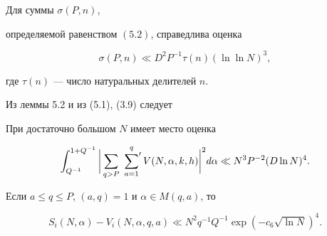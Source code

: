 \begin{lems}


Для суммы $\sigma (P, n)$, 


определяемой равенством $(5.2)$, справедлива оценка


$$


\sigma (P, n)\ll D^2 P^{-1}\tau(n)(\ln\ln N)^3, 


$$


где $\tau(n)$ --- число натуральных делителей $n$.


\end{lems}





Из леммы 5.2 и из (5.1), (3.9) следует 





\begin{lems}


При достаточно большом $N$ имеет место оценка


$$


\int_{Q^{-1}}^{1+Q^{-1}}


\bigg|\sum_{q> P}\,\sideset{}{'}\sum_{a=1}^q V(N,\alpha,k,h)\bigg|^2


d\alpha \ll N^3P^{-2}(D \ln N)^4.


$$


\end{lems}


 


\begin{lems}


Если $a\le q\le P$, $(a, q)=1$ и $\alpha\in M(q, a)$, то


$$


S_i(N,\alpha)-V_i(N, \alpha, q, a)\ll 


N^2q^{-1}Q^{-1}\exp (-c_6\sqrt{\ln N})^4.


$$


\end{lems}





